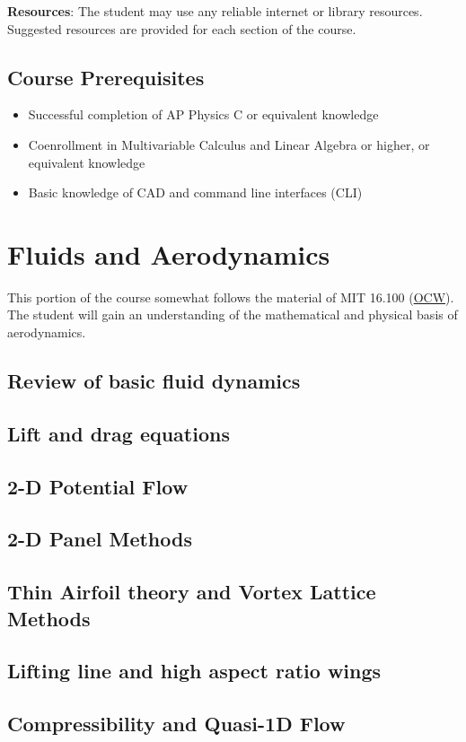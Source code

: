 \documentclass[12pt]{article}
\begin{document}
		\textbf{Resources}: The student may use any reliable internet or library resources. Suggested resources are provided for each section of the course.  
	\subsection{Course Prerequisites}
		\begin{itemize}
			\item Successful completion of AP Physics C or equivalent knowledge
			\item Coenrollment in Multivariable Calculus and Linear Algebra or higher, or equivalent knowledge
			\item Basic knowledge of CAD and command line interfaces (CLI)
		\end{itemize}
\section{Fluids and Aerodynamics}
This portion of the course somewhat follows the material of MIT 16.100 (\href{https://ocw.mit.edu/courses/aeronautics-and-astronautics/16-100-aerodynamics-fall-2005/index.htm}{OCW}). The student will gain an understanding of the mathematical and physical basis of aerodynamics. 
	\subsection{Review of basic fluid dynamics}
	\subsection{Lift and drag equations}
	\subsection{2-D Potential Flow}
	\subsection{2-D Panel Methods}
	\subsection{Thin Airfoil theory and Vortex Lattice Methods}
	\subsection{Lifting line and high aspect ratio wings}
	\subsection{Compressibility and Quasi-1D Flow }
\end{document}
